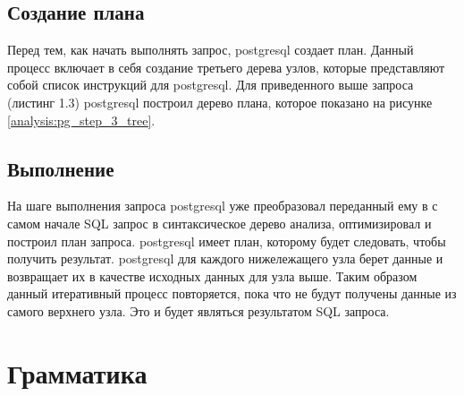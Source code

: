 \subsection{Создание плана}

Перед тем, как начать выполнять запрос, postgresql создает план.
Данный процесс включает в себя создание третьего дерева узлов, 
которые представляют собой список инструкций для postgresql.
Для приведенного выше запроса (листинг 1.3) postgresql построил 
дерево плана, которое показано на рисунке \ref{analysis:pg_step_3_tree}.

\begin{figure}[ht!]
\end{figure}

\subsection{Выполнение}

На шаге выполнения запроса postgresql уже преобразовал переданный ему в с самом начале 
SQL запрос в синтаксическое дерево анализа, оптимизировал и построил план запроса.
postgresql имеет план, которому будет следовать, чтобы получить результат.
postgresql для каждого нижележащего узла берет данные и возвращает их 
в качестве исходных данных для узла выше. 
Таким образом данный итеративный процесс повторяется,
пока что не будут получены данные из самого верхнего узла.
Это и будет являться результатом SQL запроса.

\section{Грамматика}


